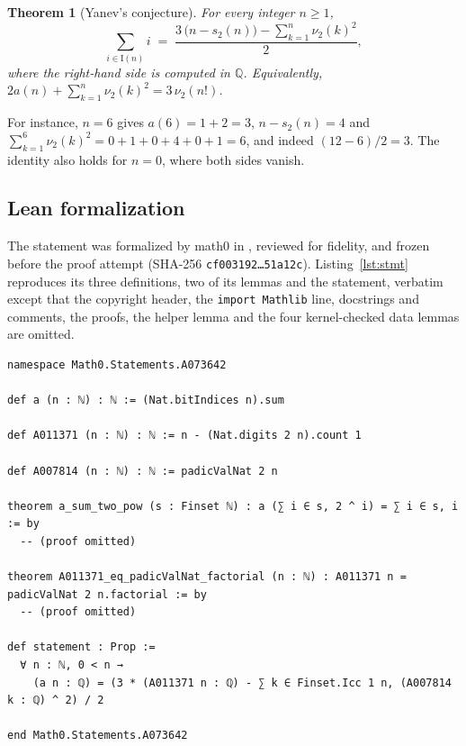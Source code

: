 \documentclass[11pt]{amsart}
\theoremstyle{plain}
\newtheorem{theorem}{Theorem}
\theoremstyle{definition}
\newcommand{\Q}{\mathbb{Q}}
\newcommand{\vt}{\nu_2}
\newcommand{\Bits}{\mathrm{I}}
\begin{document}
\begin{theorem}[Yanev's conjecture]\label{thm:main}
For every integer $n\ge1$,
\[
  \sum_{i\in\Bits(n)} i \;=\; \frac{3\,\bigl(n-s_2(n)\bigr)-\sum_{k=1}^{n}\vt(k)^2}{2},
\]
where the right-hand side is computed in $\Q$. Equivalently, $2a(n)+\sum_{k=1}^{n}\vt(k)^2=3\,\vt(n!)$.
\end{theorem}

For instance, $n=6$ gives $a(6)=1+2=3$, $n-s_2(n)=4$ and $\sum_{k=1}^{6}\vt(k)^2=0+1+0+4+0+1=6$, and indeed $(12-6)/2=3$. The identity also holds for $n=0$, where both sides vanish.

\subsection*{Lean formalization}
The statement was formalized by math0 in , reviewed for fidelity, and frozen before the proof attempt (SHA-256 \texttt{cf003192\dots 51a12c}). Listing~\ref{lst:stmt} reproduces its three definitions, two of its lemmas and the statement, verbatim except that the copyright header, the \texttt{import Mathlib} line, docstrings and comments, the proofs, the helper lemma  and the four kernel-checked data lemmas are omitted.
\begin{lstlisting}[float=tp,caption={The frozen statement file \texttt{Math0/Statements/OEIS/A073642.lean} (excerpt).},label=lst:stmt]
namespace Math0.Statements.A073642

def a (n : ℕ) : ℕ := (Nat.bitIndices n).sum

def A011371 (n : ℕ) : ℕ := n - (Nat.digits 2 n).count 1

def A007814 (n : ℕ) : ℕ := padicValNat 2 n

theorem a_sum_two_pow (s : Finset ℕ) : a (∑ i ∈ s, 2 ^ i) = ∑ i ∈ s, i := by
  -- (proof omitted)

theorem A011371_eq_padicValNat_factorial (n : ℕ) : A011371 n = padicValNat 2 n.factorial := by
  -- (proof omitted)

def statement : Prop :=
  ∀ n : ℕ, 0 < n →
    (a n : ℚ) = (3 * (A011371 n : ℚ) - ∑ k ∈ Finset.Icc 1 n, (A007814 k : ℚ) ^ 2) / 2

end Math0.Statements.A073642
\end{lstlisting}
\end{document}
